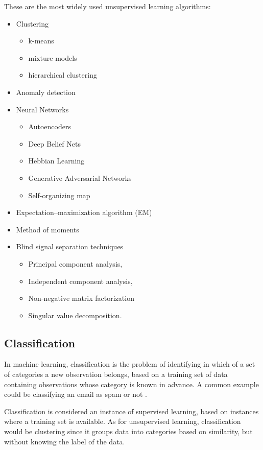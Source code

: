 These are the most widely used unsupervised learning algorithms:

\begin{itemize}[noitemsep]
	\item Clustering
	\begin{itemize}[noitemsep]
		\item k-means
		\item mixture models
		\item hierarchical clustering
	\end{itemize}
	\item Anomaly detection
	\item Neural Networks
	\begin{itemize}[noitemsep]
		\item Autoencoders
		\item Deep Belief Nets
		\item Hebbian Learning
		\item Generative Adversarial Networks
		\item Self-organizing map
	\end{itemize}
	\item Expectation–maximization algorithm (EM)
	\item Method of moments
	\item Blind signal separation techniques
	\begin{itemize}[noitemsep]
		\item Principal component analysis,
		\item Independent component analysis,
		\item Non-negative matrix factorization
		\item Singular value decomposition.
	\end{itemize}
\end{itemize}

\subsection{Classification} \label{classification}
In machine learning, classification is the problem of identifying in which of a set of categories a new observation belongs, based on a training set of data containing observations whose category is known in advance. A common example could be classifying an email as spam or not \cite{wiki:classification}.

Classification is considered an instance of supervised learning, based on instances where a training set is available. As for unsupervised learning, classification would be clustering since it groups data into categories based on similarity, but without knowing the label of the data.

